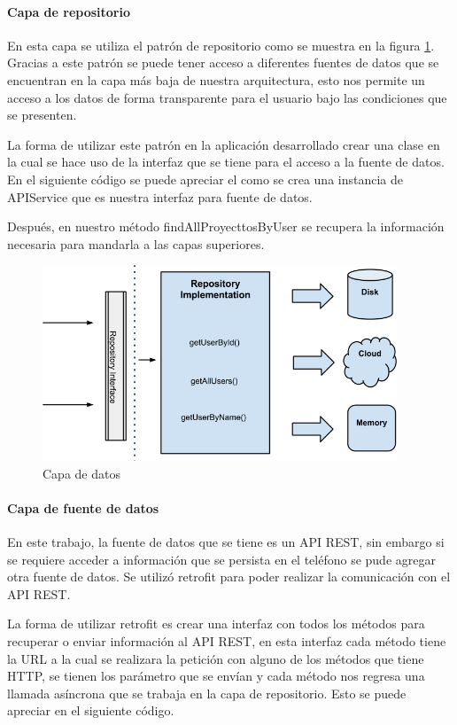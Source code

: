 \paragraph{Capa de repositorio} En esta capa se utiliza el patrón de repositorio como se muestra en la figura \ref{fig:capa-datos}. Gracias a este patrón se puede tener acceso a diferentes fuentes de datos que se encuentran en la capa más baja de nuestra arquitectura, esto nos permite un acceso a los datos de forma transparente para el usuario bajo las condiciones que se presenten.

La forma de utilizar este patrón en la aplicación desarrollado crear una clase en la cual se hace uso de la interfaz que se tiene para el acceso a la fuente de datos. En el siguiente código se puede apreciar el como se crea una instancia de APIService que es nuestra interfaz para fuente de datos.

Después, en nuestro método findAllProyecttosByUser se recupera la información necesaria para mandarla a las capas superiores.

%

\begin{figure}[h]
	\centering
	\includegraphics[width=400px]{capitulo5/android/img/capa-datos.png}
	\caption{Capa de datos \cite{cleanWay}}
	\label{fig:capa-datos}
\end{figure}

\paragraph{Capa de fuente de datos} En este trabajo, la fuente de datos que se tiene es un API REST, sin embargo si se requiere acceder a información que se persista en el teléfono se pude agregar otra fuente de datos. Se utilizó retrofit para poder realizar la comunicación con el API REST. 

La forma de utilizar retrofit es crear una interfaz con todos los métodos para recuperar o enviar información al API REST, en esta interfaz cada método tiene la URL a la cual se realizara la petición con alguno de los métodos que tiene HTTP, se tienen los parámetro que se envían y cada método nos regresa una llamada asíncrona que se trabaja en la capa de repositorio. Esto se puede apreciar en el siguiente código.

